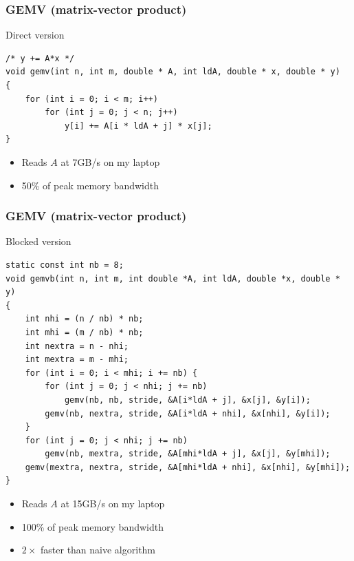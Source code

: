 \documentclass[xcolor={x11names,svgnames}]{beamer}
\begin{document}
\begin{frame}[fragile=singleslide]
  \frametitle{GEMV (matrix-vector product)}

  \begin{block}{Direct version}
\begin{verbatim}
/* y += A*x */
void gemv(int n, int m, double * A, int ldA, double * x, double * y)
{
    for (int i = 0; i < m; i++)
        for (int j = 0; j < n; j++)
            y[i] += A[i * ldA + j] * x[j];
}
\end{verbatim}
    \begin{itemize}
    \item Reads $A$ at 7GB/s on my laptop
    \item 50\% of peak memory bandwidth
    \end{itemize}
  \end{block}
\end{frame}


\begin{frame}[fragile=singleslide]
  \frametitle{GEMV (matrix-vector product)}

\begin{alertblock}{Blocked version}
\begin{verbatim}
static const int nb = 8;
void gemvb(int n, int m, int double *A, int ldA, double *x, double * y)
{
    int nhi = (n / nb) * nb;
    int mhi = (m / nb) * nb;
    int nextra = n - nhi;
    int mextra = m - mhi;
    for (int i = 0; i < mhi; i += nb) {
        for (int j = 0; j < nhi; j += nb)
            gemv(nb, nb, stride, &A[i*ldA + j], &x[j], &y[i]);
        gemv(nb, nextra, stride, &A[i*ldA + nhi], &x[nhi], &y[i]);
    }
    for (int j = 0; j < nhi; j += nb)
        gemv(nb, mextra, stride, &A[mhi*ldA + j], &x[j], &y[mhi]);
    gemv(mextra, nextra, stride, &A[mhi*ldA + nhi], &x[nhi], &y[mhi]);
}
\end{verbatim}
    \begin{itemize}
    \item Reads $A$ at 15GB/s on my laptop
    \item 100\% of peak memory bandwidth
    \item $2\times$ faster than naive algorithm
    \end{itemize}

\end{alertblock}
\end{frame}

\end{document}
